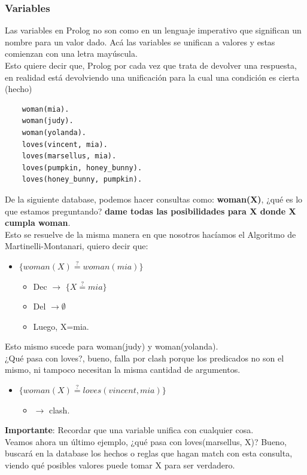 \documentclass[10pt,a4paper]{article}
\begin{document}
\subsubsection*{Variables}
Las variables en Prolog no son como en un lenguaje imperativo que significan un nombre para un valor dado. Acá las variables se unifican a valores y estas comienzan con una letra mayúscula. \\
Esto quiere decir que, Prolog por cada vez que trata de devolver una respuesta, en realidad está devolviendo una unificación para la cual una condición es cierta (hecho) 
\begin{lstlisting}
    woman(mia).
    woman(judy).
    woman(yolanda).
    loves(vincent, mia).
    loves(marsellus, mia).
    loves(pumpkin, honey_bunny).
    loves(honey_bunny, pumpkin).
\end{lstlisting}
De la siguiente database, podemos hacer consultas como: \textbf{woman(X)}, ¿qué es lo que estamos preguntando? \textbf{dame todas las posibilidades para X donde X cumpla woman}. \\
Esto se resuelve de la misma manera en que nosotros hacíamos el Algoritmo de Martinelli-Montanari, quiero decir que: 
\begin{itemize}
    \item $\{woman(X) \stackrel{?}{=} woman(mia)\}$
    \begin{itemize}
        \item Dec $\rightarrow$ $\{X \stackrel{?}{=} mia\}$  
        \item Del $\rightarrow \emptyset$
        \item Luego, X=mia. 
    \end{itemize}
\end{itemize}
Esto mismo sucede para woman(judy) y woman(yolanda). \\
¿Qué pasa con loves?, bueno, falla por clash porque los predicados no son el mismo, ni tampoco necesitan la misma cantidad de argumentos.
\begin{itemize}
    \item $\{woman(X) \stackrel{?}{=} loves(vincent, mia)\}$
    \begin{itemize}
        \item $\rightarrow$ clash. 
    \end{itemize}
\end{itemize}
\textbf{Importante}: Recordar que una variable unifica con cualquier cosa. \\
Veamos ahora un último ejemplo, ¿qué pasa con loves(marsellus, X)? Bueno, buscará en la database los hechos o reglas que hagan match con esta consulta, viendo qué posibles valores puede tomar X para ser verdadero. \\
\end{document}
